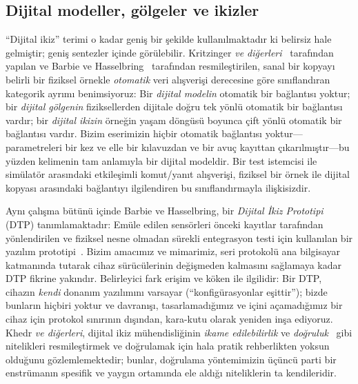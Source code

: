 \documentclass[9pt,twocolumn,a4paper]{extarticle}
\begin{document}
\subsection{Dijital modeller, gölgeler ve ikizler}
``Dijital ikiz'' terimi o kadar geniş bir şekilde kullanılmaktadır ki belirsiz hale gelmiştir; geniş sentezler \cite{tao2019dt,rasheed2020dt} içinde görülebilir. Kritzinger \emph{ve diğerleri}~\cite{kritzinger2018dt} tarafından yapılan ve Barbie ve Hasselbring~\cite{barbie2024dtp} tarafından resmileştirilen, sanal bir kopyayı belirli bir fiziksel örnekle \emph{otomatik} veri alışverişi derecesine göre sınıflandıran kategorik ayrımı benimsiyoruz: Bir \emph{dijital modelin} otomatik bir bağlantısı yoktur; bir \emph{dijital gölgenin} fiziksellerden dijitale doğru tek yönlü otomatik bir bağlantısı vardır; bir \emph{dijital ikizin} örneğin yaşam döngüsü boyunca çift yönlü otomatik bir bağlantısı vardır. Bizim eserimizin hiçbir otomatik bağlantısı yoktur---parametreleri bir kez ve elle bir kılavuzdan ve bir avuç kayıttan çıkarılmıştır---bu yüzden kelimenin tam anlamıyla bir dijital modeldir. Bir test istemcisi ile simülatör arasındaki etkileşimli komut/yanıt alışverişi, fiziksel bir örnek ile dijital kopyası arasındaki bağlantıyı ilgilendiren bu sınıflandırmayla ilişkisizdir.

Aynı çalışma bütünü içinde Barbie ve Hasselbring, bir \emph{Dijital İkiz Prototipi} (DTP) tanımlamaktadır: Emüle edilen sensörleri önceki kayıtlar tarafından yönlendirilen ve fiziksel nesne olmadan sürekli entegrasyon testi için kullanılan bir yazılım prototipi~\cite{barbie2024dtp,barbie2023smartfarming}. Bizim amacımız ve mimarimiz, seri protokolü ana bilgisayar katmanında tutarak cihaz sürücülerinin değişmeden kalmasını sağlamaya kadar DTP fikrine yakındır. Belirleyici fark erişim ve köken ile ilgilidir: Bir DTP, cihazın \emph{kendi} donanım yazılımını varsayar (``konfigürasyonlar eşittir''); bizde bunların hiçbiri yoktur ve davranışı, tasarlamadığımız ve içini açamadığımız bir cihaz için protokol sınırının dışından, kara-kutu olarak yeniden inşa ediyoruz. Khedr \emph{ve diğerleri}, dijital ikiz mühendisliğinin \emph{ikame edilebilirlik} ve \emph{doğruluk}~\cite{khedr2026sos} gibi nitelikleri resmileştirmek ve doğrulamak için hala pratik rehberlikten yoksun olduğunu gözlemlemektedir; bunlar, doğrulama yöntemimizin üçüncü parti bir enstrümanın spesifik ve yaygın ortamında ele aldığı niteliklerin ta kendileridir.
\end{document}
